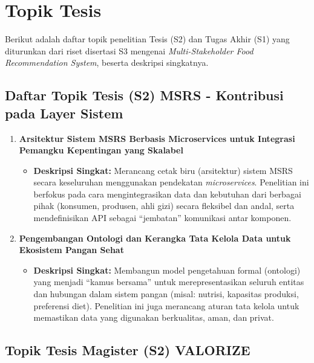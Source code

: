 \documentclass[
  letterpaper,
  DIV=11,
  numbers=noendperiod]{scrreprt}
\providecommand{\tightlist}{%
  \setlength{\itemsep}{0pt}\setlength{\parskip}{0pt}}
\begin{document}
\chapter{Topik Tesis}\label{topik-tesis}

Berikut adalah daftar topik penelitian Tesis (S2) dan Tugas Akhir (S1)
yang diturunkan dari riset disertasi S3 mengenai \emph{Multi-Stakeholder
Food Recommendation System}, beserta deskripsi singkatnya.

\section{\texorpdfstring{\textbf{Daftar Topik Tesis (S2) MSRS -
Kontribusi pada Layer
Sistem}}{Daftar Topik Tesis (S2) MSRS - Kontribusi pada Layer Sistem}}\label{daftar-topik-tesis-s2-msrs---kontribusi-pada-layer-sistem}

\begin{enumerate}
\def\labelenumi{\arabic{enumi}.}
\tightlist
\item
  \textbf{Arsitektur Sistem MSRS Berbasis Microservices untuk Integrasi
  Pemangku Kepentingan yang Skalabel}

  \begin{itemize}
  \tightlist
  \item
    \textbf{Deskripsi Singkat:} Merancang cetak biru (arsitektur) sistem
    MSRS secara keseluruhan menggunakan pendekatan \emph{microservices}.
    Penelitian ini berfokus pada cara mengintegrasikan data dan
    kebutuhan dari berbagai pihak (konsumen, produsen, ahli gizi) secara
    fleksibel dan andal, serta mendefinisikan API sebagai ``jembatan''
    komunikasi antar komponen.
  \end{itemize}
\item
  \textbf{Pengembangan Ontologi dan Kerangka Tata Kelola Data untuk
  Ekosistem Pangan Sehat}

  \begin{itemize}
  \tightlist
  \item
    \textbf{Deskripsi Singkat:} Membangun model pengetahuan formal
    (ontologi) yang menjadi ``kamus bersama'' untuk merepresentasikan
    seluruh entitas dan hubungan dalam sistem pangan (misal: nutrisi,
    kapasitas produksi, preferensi diet). Penelitian ini juga merancang
    aturan tata kelola untuk memastikan data yang digunakan berkualitas,
    aman, dan privat.
  \end{itemize}
\end{enumerate}

\section{Topik Tesis Magister (S2)
VALORIZE}\label{topik-tesis-magister-s2-valorize}
\end{document}
